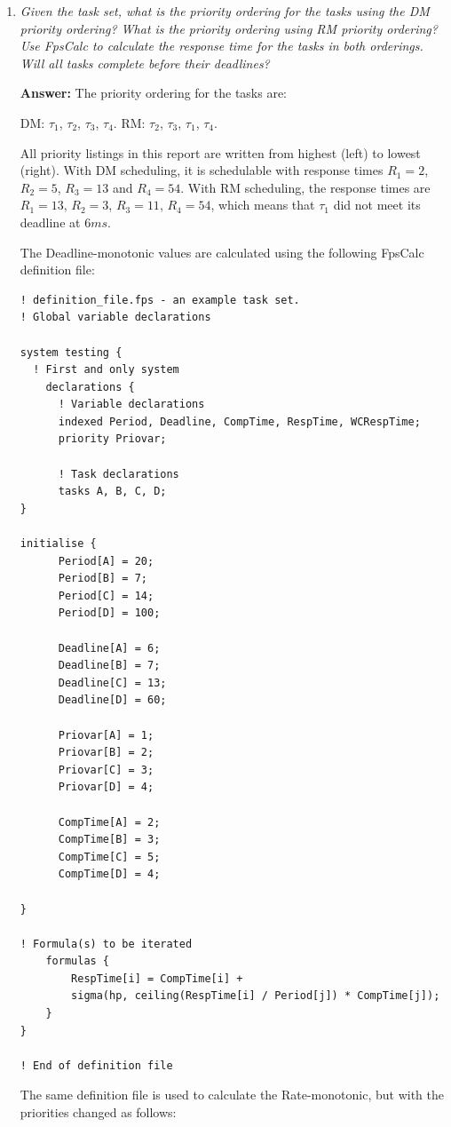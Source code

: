 \documentclass[a4paper,10pt]{article}
\newcommand{\answer}{\textbf{Answer: }}
\begin{document}
\begin{enumerate}
	\item \emph{Given the task set, what is the priority ordering for the tasks using the DM priority ordering? What is the priority ordering using RM priority ordering? Use FpsCalc to calculate the response time for the tasks in both orderings. Will all tasks complete before their deadlines?}
	
	\answer The priority ordering for the tasks are:
	
	DM: $\tau_1$, $\tau_2$, $\tau_3$, $\tau_4$.
	RM: $\tau_2$, $\tau_3$, $\tau_1$, $\tau_4$.
	
	All priority listings in this report are written from highest (left) to lowest (right). With DM scheduling, it is schedulable with response times $R_1 = 2$, $R_2 = 5$, $R_3 = 13$ and $R_4 = 54$. With RM scheduling, the response times are $R_1 = 13$, $R_2 = 3$, $R_3 = 11$, $R_4 = 54$, which means that $\tau_1$ did not meet its deadline at $6ms$.
	
	The Deadline-monotonic values are calculated using the following FpsCalc definition file:

        \begin{lstlisting}
! definition_file.fps - an example task set.
! Global variable declarations

system testing {
  ! First and only system
    declarations {		
      ! Variable declarations
      indexed Period, Deadline, CompTime, RespTime, WCRespTime;
      priority Priovar;	
			      	       
      ! Task declarations
      tasks A, B, C, D;
}

initialise {
	  Period[A] = 20;
	  Period[B] = 7;
	  Period[C] = 14;
	  Period[D] = 100;
	  
	  Deadline[A] = 6;
	  Deadline[B] = 7;
	  Deadline[C] = 13;
	  Deadline[D] = 60;
	  
	  Priovar[A] = 1;
	  Priovar[B] = 2;
	  Priovar[C] = 3;
	  Priovar[D] = 4;
	  
	  CompTime[A] = 2;
	  CompTime[B] = 3;
	  CompTime[C] = 5;
	  CompTime[D] = 4;

}

! Formula(s) to be iterated
    formulas {
        RespTime[i] = CompTime[i] +
	    sigma(hp, ceiling(RespTime[i] / Period[j]) * CompTime[j]);
    }
}				   

! End of definition file
        \end{lstlisting}

        The same definition file is used to calculate the Rate-monotonic, but with the priorities changed as follows:


\end{enumerate}
\end{document}
